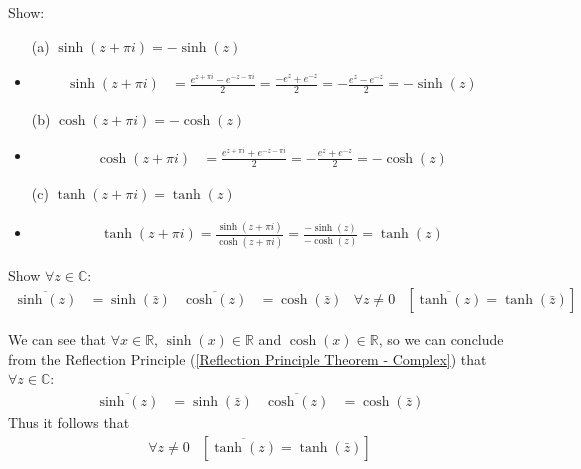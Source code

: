 \documentclass[12pt, english]{book}
\makeatletter
\renewenvironment{proof}[1][\proofname]{\par
	\pushQED{\qed}%
	\normalfont \topsep6\p@\@plus6\p@\relax
	\list{}{%
		\settowidth{\leftmargin}{\itshape\proofname:\hskip\labelsep}%
		\setlength{\labelwidth}{0pt}%
		\setlength{\itemindent}{-\leftmargin}%
	}%
	\item[\hskip\labelsep\itshape#1\@addpunct{:}]\ignorespaces
	}{ \popQED\endlist\@endpefalse}
\makeatother
\begin{document}
	\begin{example}
		Show: 
		\begin{itemize}
			\item[(a)] \(\sinh(z + \pi i) = -\sinh(z)\)
			\begin{proof}
				{\color{Grey}
					\begin{align*}
						\sinh(z + \pi i) 
						&= \frac{e^{z + \pi i} - e^{-z - \pi i}}{2}
						 = \frac{-e^z + e^{-z}}{2}
						 = -\frac{e^z - e^{-z}}{2} = -\sinh(z)
					\end{align*}
				}
			\end{proof}
			\item[(b)] \(\cosh(z + \pi i) = - \cosh(z) \)
			\begin{proof}
				{\color{Grey}
				\begin{align*}
					\cosh(z + \pi i) 
					&= \frac{e^{z + \pi i} + e^{-z - \pi i}}{2} 
					 = -\frac{e^z + e^{-z}}{2} = -\cosh(z)
				\end{align*}
				}
			\end{proof}
			\item[(c)] \(\tanh(z + \pi i) = \tanh(z)\)
			\begin{proof}
				{\color{Grey}
				\begin{align*}
					\tanh(z + \pi i) = \frac{\sinh(z + \pi i)}{\cosh(z + \pi i)} = \frac{-\sinh(z)}{-\cosh(z)} = \tanh(z)
				\end{align*}
				}
			\end{proof}
		\end{itemize}
	\end{example}
	
	\begin{example}
		Show \(\forall z \in \mathbb{C}\):
		\begin{align*}
			\overline{\sinh(z)} &= \sinh(\bar{z}) & \overline{\cosh(z)} &= \cosh(\bar{z}) &
			\forall z \neq 0 &\left[\overline{\tanh(z)} = \tanh(\bar{z})\right]
		\end{align*}
		\begin{proof}
		{\color{Grey}
			We can see that \(\forall x \in \mathbb{R}\), \(\sinh(x) \in \mathbb{R}\) and \(\cosh(x) \in \mathbb{R}\), so we can conclude from the Reflection Principle (\cref{Reflection Principle Theorem - Complex}) that \(\forall z \in \mathbb{C}\):
			\begin{align*}
				\overline{\sinh(z)} &= \sinh(\bar{z}) & \overline{\cosh(z)} &= \cosh(\bar{z})
			\end{align*}
			Thus it follows that 
			\begin{align*}
				\forall z \neq 0 &\left[\overline{\tanh(z)} = \tanh(\bar{z})\right]
			\end{align*}
		}
		\end{proof}
	\end{example}
	
\end{document}

